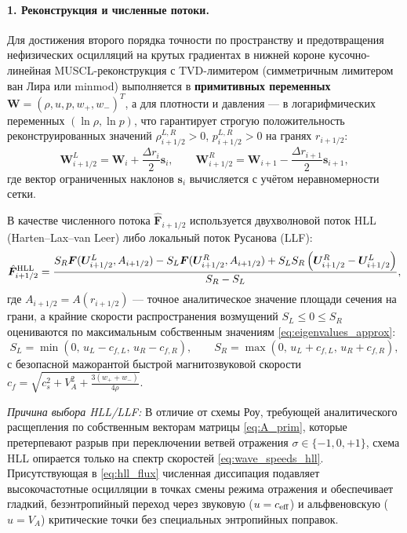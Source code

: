 \documentclass[11pt,a4paper]{article}
\begin{document}
\paragraph{1. Реконструкция и численные потоки.}
Для достижения второго порядка точности по пространству и предотвращения нефизических осцилляций на крутых градиентах в нижней короне кусочно-линейная MUSCL-реконструкция с TVD-лимитером (симметричным лимитером ван Лира или minmod) выполняется в \textbf{примитивных переменных} $\bm{W} = (\rho, u, p, w_+, w_-)^T$, а для плотности и давления --- в логарифмических переменных $(\ln\rho, \ln p)$, что гарантирует строгую положительность реконструированных значений $\rho_{i+1/2}^{L,R} > 0$, $p_{i+1/2}^{L,R} > 0$ на гранях $r_{i+1/2}$:
\begin{equation}
\bm{W}_{i+1/2}^L = \bm{W}_i + \frac{\Delta r_i}{2}\bm{s}_i, \qquad
\bm{W}_{i+1/2}^R = \bm{W}_{i+1} - \frac{\Delta r_{i+1}}{2}\bm{s}_{i+1},
\label{eq:muscl_recon}
\end{equation}
где вектор ограниченных наклонов $\bm{s}_i$ вычисляется с учётом неравномерности сетки.

В качестве численного потока $\hat{\bm{F}}_{i+1/2}$ используется двухволновой поток HLL (Harten--Lax--van Leer) либо локальный поток Русанова (LLF):
\begin{equation}
\hat{\bm{F}}_{i+1/2}^{\rm HLL} = \frac{S_R\bm{F}(\bm{U}_{i+1/2}^L, A_{i+1/2}) - S_L\bm{F}(\bm{U}_{i+1/2}^R, A_{i+1/2}) + S_L S_R\left(\bm{U}_{i+1/2}^R - \bm{U}_{i+1/2}^L\right)}{S_R - S_L},
\label{eq:hll_flux}
\end{equation}
где $A_{i+1/2} = A(r_{i+1/2})$ --- точное аналитическое значение площади сечения на грани, а крайние скорости распространения возмущений $S_L \le 0 \le S_R$ оцениваются по максимальным собственным значениям \eqref{eq:eigenvalues_approx}:
\begin{equation}
S_L = \min\left(0,\, u_L - c_{f,L},\, u_R - c_{f,R}\right), \qquad
S_R = \max\left(0,\, u_L + c_{f,L},\, u_R + c_{f,R}\right),
\label{eq:wave_speeds_hll}
\end{equation}
с безопасной мажорантой быстрой магнитозвуковой скорости $c_f = \sqrt{c_s^2 + V_A^2 + \frac{3(w_+ + w_-)}{4\rho}}$.

\emph{Причина выбора HLL/LLF:} В отличие от схемы Роу, требующей аналитического расщепления по собственным векторам матрицы \eqref{eq:A_prim}, которые претерпевают разрыв при переключении ветвей отражения $\sigma \in \{-1,0,+1\}$, схема HLL опирается только на спектр скоростей \eqref{eq:wave_speeds_hll}. Присутствующая в \eqref{eq:hll_flux} численная диссипация подавляет высокочастотные осцилляции в точках смены режима отражения и обеспечивает гладкий, безэнтропийный переход через звуковую ($u = c_{\rm eff}$) и альфвеновскую ($u = V_A$) критические точки без специальных энтропийных поправок.
\end{document}
